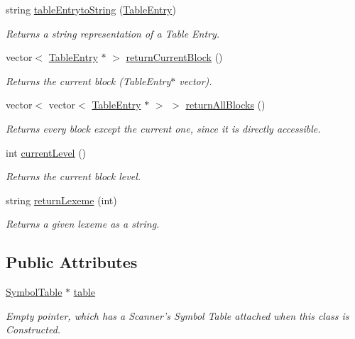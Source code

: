 \begin{DoxyCompactItemize}
string \hyperlink{classBlockTable_aeabaace35d80418e397dcf20c230f9b9}{tableEntrytoString} (\hyperlink{structTableEntry}{TableEntry})
\begin{DoxyCompactList}\small\item\em Returns a string representation of a Table Entry. \item\end{DoxyCompactList}\item 
vector$<$ \hyperlink{structTableEntry}{TableEntry} $\ast$ $>$ \hyperlink{classBlockTable_a2d731b3b9e3313c65eb8d065d3ee9a0e}{returnCurrentBlock} ()
\begin{DoxyCompactList}\small\item\em Returns the current block (TableEntry$\ast$ vector). \item\end{DoxyCompactList}\item 
vector$<$ vector$<$ \hyperlink{structTableEntry}{TableEntry} $\ast$ $>$ $>$ \hyperlink{classBlockTable_a0693b9fbb429eb427818b922796f0b4f}{returnAllBlocks} ()
\begin{DoxyCompactList}\small\item\em Returns every block except the current one, since it is directly accessible. \item\end{DoxyCompactList}\item 
int \hyperlink{classBlockTable_a445bc009943824d2611e64b10bcffecb}{currentLevel} ()
\begin{DoxyCompactList}\small\item\em Returns the current block level. \item\end{DoxyCompactList}\item 
string \hyperlink{classBlockTable_ac9c14b3836cb319a290db4bb6e952a49}{returnLexeme} (int)
\begin{DoxyCompactList}\small\item\em Returns a given lexeme as a string. \item\end{DoxyCompactList}\end{DoxyCompactItemize}
\subsection*{Public Attributes}
\begin{DoxyCompactItemize}
\item 
\hyperlink{classSymbolTable}{SymbolTable} $\ast$ \hyperlink{classBlockTable_af9fff1a8017fac6c965910c1484d3d09}{table}
\begin{DoxyCompactList}\small\item\em Empty pointer, which has a Scanner's Symbol Table attached when this class is Constructed. \item\end{DoxyCompactList}\end{DoxyCompactItemize}

